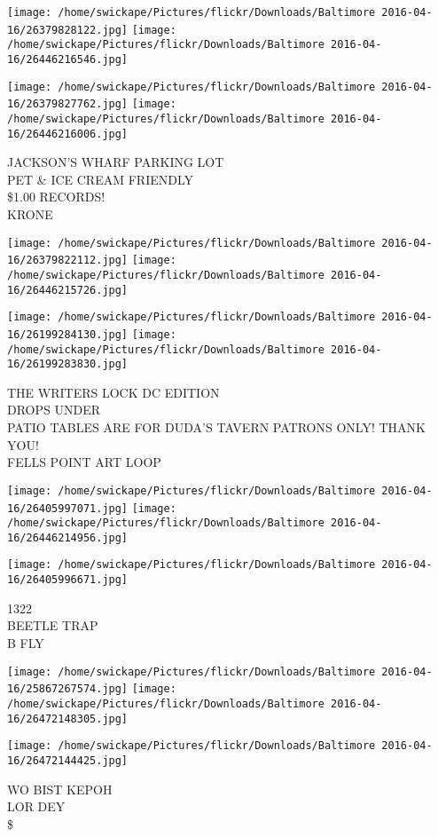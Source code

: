 \documentclass[10pt,letterpaper]{article}
\begin{document}
\texttt{[image: /home/swickape/Pictures/flickr/Downloads/Baltimore 2016-04-16/26379828122.jpg]}
\texttt{[image: /home/swickape/Pictures/flickr/Downloads/Baltimore 2016-04-16/26446216546.jpg]}

\texttt{[image: /home/swickape/Pictures/flickr/Downloads/Baltimore 2016-04-16/26379827762.jpg]}
\texttt{[image: /home/swickape/Pictures/flickr/Downloads/Baltimore 2016-04-16/26446216006.jpg]}

JACKSON'S WHARF PARKING LOT\\
PET \& ICE CREAM FRIENDLY\\
\$1.00 RECORDS!\\
KRONE
\pagebreak

\texttt{[image: /home/swickape/Pictures/flickr/Downloads/Baltimore 2016-04-16/26379822112.jpg]}
\texttt{[image: /home/swickape/Pictures/flickr/Downloads/Baltimore 2016-04-16/26446215726.jpg]}

\texttt{[image: /home/swickape/Pictures/flickr/Downloads/Baltimore 2016-04-16/26199284130.jpg]}
\texttt{[image: /home/swickape/Pictures/flickr/Downloads/Baltimore 2016-04-16/26199283830.jpg]}

THE WRITERS LOCK DC EDITION\\
DROPS UNDER\\
PATIO TABLES ARE FOR DUDA'S TAVERN PATRONS ONLY!  THANK YOU!\\
FELLS POINT ART LOOP
\pagebreak

\texttt{[image: /home/swickape/Pictures/flickr/Downloads/Baltimore 2016-04-16/26405997071.jpg]}
\texttt{[image: /home/swickape/Pictures/flickr/Downloads/Baltimore 2016-04-16/26446214956.jpg]}

\vspace{0.25in}
\texttt{[image: /home/swickape/Pictures/flickr/Downloads/Baltimore 2016-04-16/26405996671.jpg]}

1322\\
BEETLE TRAP\\
B FLY
\pagebreak

\texttt{[image: /home/swickape/Pictures/flickr/Downloads/Baltimore 2016-04-16/25867267574.jpg]}
\texttt{[image: /home/swickape/Pictures/flickr/Downloads/Baltimore 2016-04-16/26472148305.jpg]}

\texttt{[image: /home/swickape/Pictures/flickr/Downloads/Baltimore 2016-04-16/26472144425.jpg]}

WO BIST KEPOH\\
LOR DEY\\
\$
\pagebreak
\end{document}

